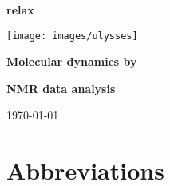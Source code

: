 \documentclass[a4paper, 11pt, twoside, openright]{book}
\begin{document}



\frontmatter



\begin{titlepage}
\begin{center}


{\Huge \textbf{relax}}

{\LARGE \textbf{}}

\centerline{\texttt{[image: images/ulysses]}}

{\huge \textbf{Molecular dynamics by}}

{\huge \textbf{NMR data analysis}}

{\large \today}

\end{center}
\end{titlepage}



\tableofcontents



\newpage
\listoffigures



\newpage
\listoftables



\chapter*{Abbreviations}
\end{document}
